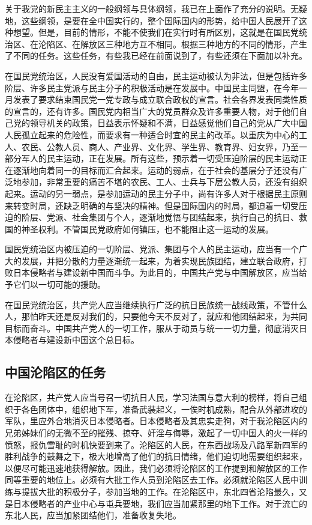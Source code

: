 关于我党的新民主主义的一般纲领与具体纲领，我已在上面作了充分的说明。无疑地，这些纲领，是要在全中国实行的，整个国际国内的形势，给中国人民展开了这种想望。但是，目前的情形，不能不使我们在实行时有所区别，这就是在国民党统治区、在沦陷区、在解放区三种地方互不相同。根据三种地方的不同的情形，产生了不同的任务。这些任务，有些我已经在前面说到了，有些还须在下面加以补充。

在国民党统治区，人民没有爱国活动的自由，民主运动被认为非法，但是包括许多阶层、许多民主党派与民主分子的积极活动是在发展中。中国民主同盟，在今年一月发表了要求结束国民党一党专政与成立联合政权的宣言。社会各界发表同类性质的宣言的，还有许多。国民党内相当广大的党员群众及许多重要人物，对于他们自己党的领导机关的政策，日益表示怀疑和不满，日益感觉他们自己的党从广大中国人民孤立起来的危险性，而要求有一种适合时宜的民主的改革。以重庆为中心的工人、农民、公教人员、商人、产业界、文化界、学生界、教育界、妇女界，乃至一部分军人的民主运动，正在发展。所有这些，预示着一切受压迫阶层的民主运动正在逐渐地向着同一的目标而汇合起来。运动的弱点，在于社会的基层分子还没有广泛地参加，非常重要的痛苦不堪的农民、工人、士兵与下层公教人员，还没有组织起来。运动的另一弱点，是参加运动的民主分子中，尚有许多人对于根据民主原则来转变时局，还缺乏明确的与坚决的精神。但是国际国内的时局，都迫着一切受压迫的阶层、党派、社会集团与个人，逐渐地觉悟与团结起来，执行自己的抗日、救国的神圣权利。不管国民党政府如何镇压，也不能阻止这一运动的发展。

国民党统治区内被压迫的一切阶层、党派、集团与个人的民主运动，应当有一个广大的发展，并把分散的力量逐渐统一起来，为着实现民族团结，建立联合政府，打败日本侵略者与建设新中国而斗争。为此目的，中国共产党与中国解放区，应当给予它们以一切可能的援助。

在国民党统治区，共产党人应当继续执行广泛的抗日民族统一战线政策，不管什么人，那怕昨天还是反对我们的，只要他今天不反对了，就应和他团结起来，为共同目标而奋斗。中国共产党人的一切工作，服从于动员与统一一切力量，彻底消灭日本侵略者与建设新中国这个总目标。

\subsection{中国沦陷区的任务}

在沦陷区，共产党人应当号召一切抗日人民，学习法国与意大利的榜样，将自己组织于各色团体中，组织地下军，准备武装起义，一俟时机成熟，配合从外部进攻的军队，里应外合地消灭日本侵略者。日本侵略者及其忠实走狗，对于我沦陷区内的兄弟姊妹们的无微不至的摧残、掠夺、奸淫与侮辱，激起了一切中国人的火一样的愤怒，报仇雪耻的时机快要到来了。沦陷区的人民，在东西战场及八路军新四军的胜利战争的鼓舞之下，极大地增高了他们的抗日情绪，他们迫切地需要组织起来，以便尽可能迅速地获得解放。因此，我们必须将沦陷区的工作提到和解放区的工作同等重要的地位上。必须有大批工作人员到沦陷区去工作。必须就沦陷区人民中训练与提拔大批的积极分子，参加当地的工作。在沦陷区中，东北四省沦陷最久，又是日本侵略者的产业中心与屯兵要地，我们应当加紧那里的地下工作。对于流亡的东北人民，应当加紧团结他们，准备收复失地。

